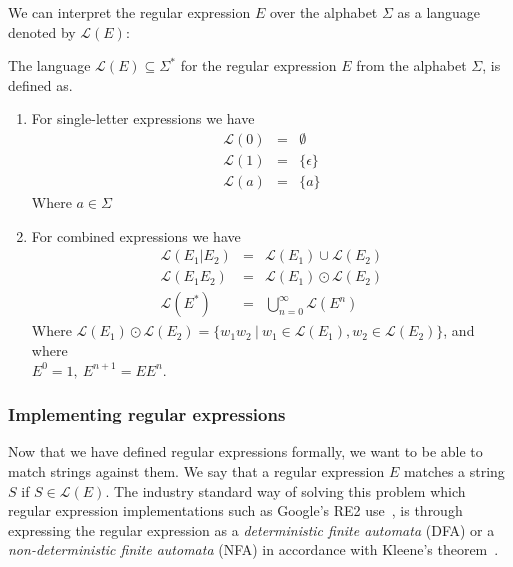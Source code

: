 \documentclass[12pt]{article}
\theoremstyle{definition}
\begin{document}
We can interpret the regular expression $E$ over the alphabet $\Sigma$ as a language denoted by $\mathcal{L}(E)$: \\

\begin{definition} The language $\mathcal{L}(E) \subseteq \Sigma^*$ for the regular expression $E$ from the alphabet $\Sigma$, is defined as.

	\begin{enumerate}
		\item For single-letter expressions we have
			\begin{eqnarray}
				\mathcal{L}(0) &=& \emptyset \\
				\mathcal{L}(1) &=& \{\epsilon\} \\
				\mathcal{L}(a) &=& \{a\}
			\end{eqnarray}
			Where $a \in \Sigma$
			
		\item For combined expressions we have
			\begin{eqnarray}
				\mathcal{L}(E_1|E_2) &=& \mathcal{L}(E_1) \cup \mathcal{L}(E_2) \\
				\mathcal{L}(E_1E_2) &=& \mathcal{L}(E_1) \odot \mathcal{L}(E_2) \\
				\mathcal{L}(E^*) &=& \bigcup^{\infty}_{n = 0}\mathcal{L}(E^n)
			\end{eqnarray}
			Where $\mathcal{L}(E_1) \odot \mathcal{L}(E_2) = \{w_1w_2 \ |\  w_1 \in \mathcal{L}(E_1), w_2 \in \mathcal{L}(E_2)\}$, and where \\
			$E^0 = 1, \ E^{n+1} = EE^n$.
	\end{enumerate}
\end{definition}


\subsubsection{Implementing regular expressions}

Now that we have defined regular expressions formally, we want to be able to match strings against them. We say that a regular expression $E$ matches a string $S$ if $S \in \mathcal{L}(E)$.
The industry standard way of solving this problem which regular expression implementations such as Google's RE2 use~\cite{matching-in-the-wild}, is through expressing the regular expression as a \textit{deterministic finite automata} (DFA) or a \textit{non-deterministic finite automata} (NFA) in accordance with Kleene's theorem~\cite{kleenes-theorem}. 
\end{document}
